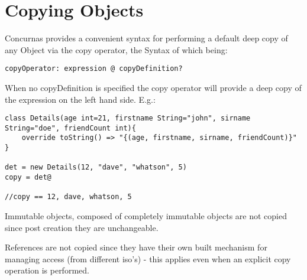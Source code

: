 \documentclass[conc-doc]{subfiles}
\begin{document}
	
	\chapter[Copying Objects]{Copying Objects}


Concurnas provides a convenient syntax for performing a default deep copy of any Object via the copy operator, the Syntax of which being:
\begin{center}
	\lstinline{copyOperator: expression @ copyDefinition?}
\end{center}

When no copyDefinition is specified the copy operator will provide a deep copy of the expression on the left hand side. E.g.:

\begin{lstlisting}
class Details(age int=21, firstname String="john", sirname String="doe", friendCount int){
	override toString() => "{(age, firstname, sirname, friendCount)}"
}

det = new Details(12, "dave", "whatson", 5)
copy = det@

//copy == 12, dave, whatson, 5
\end{lstlisting}

Immutable objects, composed of completely immutable objects are not copied since post creation they are unchangeable. 

References are not copied since they have their own built mechanism for managing access (from different iso's) - this applies even when an explicit copy operation is performed.
\end{document}
